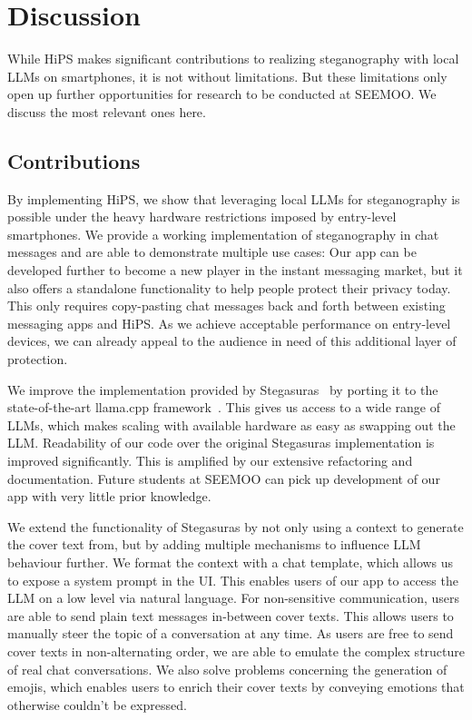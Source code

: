 
\chapter{Discussion}\label{ch:discussion} %
\glsresetall %

While \gls{HiPS} makes significant contributions to realizing steganography with local \glspl{LLM} on smartphones, it is not without limitations. But these limitations only open up further opportunities for research to be conducted at SEEMOO. We discuss the most relevant ones here.

\section{Contributions}
\label{sec:contributions}
By implementing \gls{HiPS}, we show that leveraging local \glspl{LLM} for steganography is possible under the heavy hardware restrictions imposed by entry-level smartphones. We provide a working implementation of steganography in chat messages and are able to demonstrate multiple use cases: Our app can be developed further to become a new player in the instant messaging market, but it also offers a standalone functionality to help people protect their privacy today. This only requires copy-pasting chat messages back and forth between existing messaging apps and \gls{HiPS}. As we achieve acceptable performance on entry-level devices, we can already appeal to the audience in need of this additional layer of protection.

We improve the implementation provided by Stegasuras~\cite{zieglerNeuralLinguisticSteganography2019} by porting it to the state-of-the-art llama.cpp framework~\cite{gerganovGgerganovLlamacpp2024}. This gives us access to a wide range of \glspl{LLM}, which makes scaling with available hardware as easy as swapping out the \gls{LLM}. Readability of our code over the original Stegasuras implementation is improved significantly. This is amplified by our extensive refactoring and documentation. Future students at SEEMOO can pick up development of our app with very little prior knowledge.

We extend the functionality of Stegasuras by not only using a context to generate the cover text from, but by adding multiple mechanisms to influence \gls{LLM} behaviour further. We format the context with a chat template, which allows us to expose a system prompt in the \gls{UI}. This enables users of our app to access the \gls{LLM} on a low level via natural language. For non-sensitive communication, users are able to send plain text messages in-between cover texts. This allows users to manually steer the topic of a conversation at any time. As users are free to send cover texts in non-alternating order, we are able to emulate the complex structure of real chat conversations. We also solve problems concerning the generation of emojis, which enables users to enrich their cover texts by conveying emotions that otherwise couldn't be expressed.

